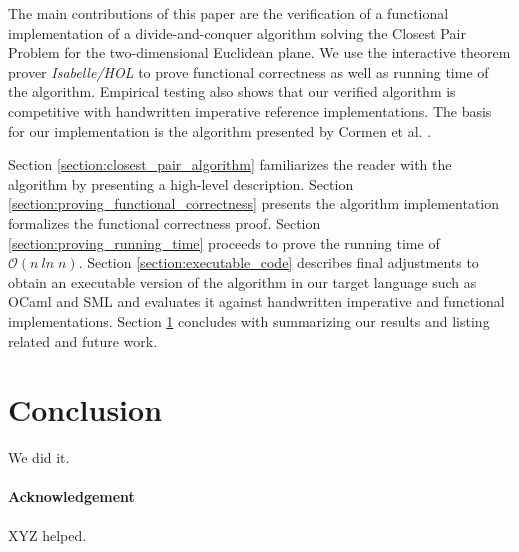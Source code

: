 \documentclass{llncs}
\begin{document}
The main contributions of this paper are the verification of a functional implementation of a
divide-and-conquer algorithm solving the Closest Pair Problem for the two-dimensional Euclidean plane.
We use the interactive theorem prover \textit{Isabelle/HOL} \cite{LNCS2283,Concrete} to prove functional
correctness as well as running time of the algorithm. Empirical testing also shows that our verified 
algorithm is competitive with handwritten imperative reference implementations. The basis for our 
implementation is the algorithm presented by Cormen et al. \cite{Introduction-to-Algorithms:2009}.

Section \ref{section:closest_pair_algorithm} familiarizes the reader with the algorithm by presenting a
high-level description. Section \ref{section:proving_functional_correctness} presents the algorithm
implementation formalizes the functional correctness proof. Section \ref{section:proving_running_time}
proceeds to prove the running time of $\mathcal{O}(n\ \mathit{ln}\;n)$. Section \ref{section:executable_code}
describes final adjustments to obtain an executable version of the algorithm in our target language
such as OCaml and SML and evaluates it against handwritten imperative and functional implementations. 
Section \ref{section:conclusion} concludes with summarizing our results and listing related and future work.



\section{Conclusion} \label{section:conclusion}

We did it.

\paragraph{Acknowledgement}
XYZ helped.



\end{document}
